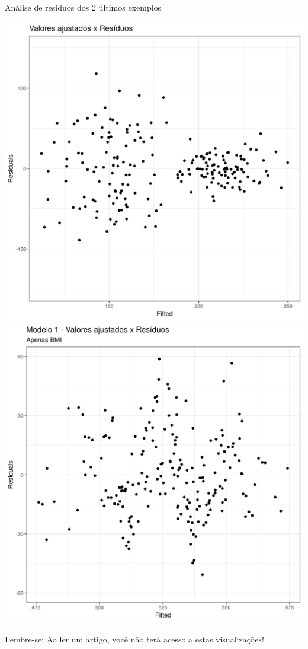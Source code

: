 \documentclass{beamer}
\begin{document}
\begin{frame}{\scriptsize Análise de resíduos dos 2 últimos exemplos}
  \begin{center}
    \includegraphics[height=.6\textheight]{Cap18-19/pratica-rls-het-resid}
    \includegraphics[height=.6\textheight]{Cap31-32/pratica-rlm1-resid}

    \vfill
    \scriptsize
    Lembre-se: Ao ler um artigo, você não terá acesso a estas visualizações!
  \end{center}
\end{frame}
\end{document}
